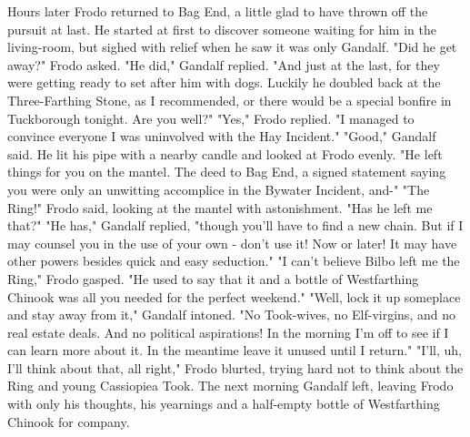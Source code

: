      Hours later Frodo returned to Bag End, a little glad to have thrown 
off the pursuit at last. He started at first to discover someone waiting 
for him in the living-room, but sighed with relief when he saw it was 
only Gandalf.
     "Did he get away?" Frodo asked.
     "He did," Gandalf replied. "And just at the last, for they were 
getting ready to set after him with dogs. Luckily he doubled back at the 
Three-Farthing Stone, as I recommended, or there would be a special 
bonfire in Tuckborough tonight. Are you well?"
     "Yes," Frodo replied. "I managed to convince everyone I was 
uninvolved with the Hay Incident."
     "Good," Gandalf said. He lit his pipe with a nearby candle and 
looked at Frodo evenly. "He left things for you on the mantel. The deed to 
Bag End, a signed statement saying you were only an unwitting accomplice 
in the Bywater Incident, and-"
     "The Ring!" Frodo said, looking at the mantel with astonishment. 
"Has he left me that?"
     "He has," Gandalf replied, "though you'll have to find a new chain. 
But if I may counsel you in the use of your own - don't use it! Now or 
later! It may have other powers besides quick and easy seduction."
     "I can't believe Bilbo left me the Ring," Frodo gasped. "He used to 
say that it and a bottle of Westfarthing Chinook was all you needed for 
the perfect weekend."
     "Well, lock it up someplace and stay away from it," Gandalf intoned. 
"No Took-wives, no Elf-virgins, and no real estate deals. And no political 
aspirations! In the morning I'm off to see if I can learn more about it. 
In the meantime leave it unused until I return."
     "I'll, uh, I'll think about that, all right," Frodo blurted, trying 
hard not to think about the Ring and young Cassiopiea Took.
     The next morning Gandalf left, leaving Frodo with only his thoughts, 
his yearnings and a half-empty bottle of Westfarthing Chinook for 
company.


